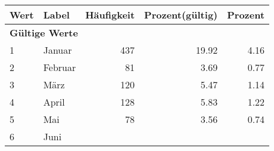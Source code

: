      \begin{longtable}{lXrrr}
     \toprule
     \textbf{Wert} & \textbf{Label} & \textbf{Häufigkeit} & \textbf{Prozent(gültig)} & \textbf{Prozent} \\
     \endhead
     \midrule
     \multicolumn{5}{l}{\textbf{Gültige Werte}}\\

     1 &
     \multicolumn{1}{X}{ Januar   } &


       \num{437} &
       \num[round-mode=places,round-precision=2]{19,92} &
         \num[round-mode=places,round-precision=2]{4,16} \\

     2 &
     \multicolumn{1}{X}{ Februar   } &


       \num{81} &
       \num[round-mode=places,round-precision=2]{3,69} &
         \num[round-mode=places,round-precision=2]{0,77} \\

     3 &
     \multicolumn{1}{X}{ März   } &


       \num{120} &
       \num[round-mode=places,round-precision=2]{5,47} &
         \num[round-mode=places,round-precision=2]{1,14} \\

     4 &
     \multicolumn{1}{X}{ April   } &


       \num{128} &
       \num[round-mode=places,round-precision=2]{5,83} &
         \num[round-mode=places,round-precision=2]{1,22} \\

     5 &
     \multicolumn{1}{X}{ Mai   } &


       \num{78} &
       \num[round-mode=places,round-precision=2]{3,56} &
         \num[round-mode=places,round-precision=2]{0,74} \\

     6 &
     \multicolumn{1}{X}{ Juni   } &



\end{longtable}
